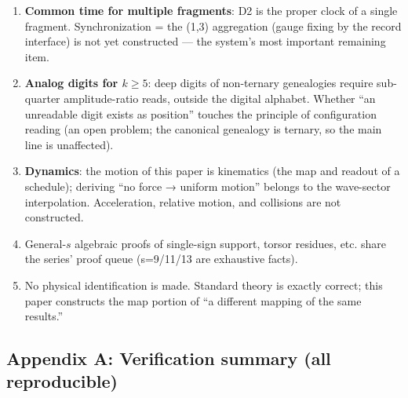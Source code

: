 \documentclass[
]{article}
\providecommand{\tightlist}{%
  \setlength{\itemsep}{0pt}\setlength{\parskip}{0pt}}
\begin{document}
\begin{enumerate}
\def\labelenumi{\arabic{enumi}.}
\tightlist
\item
  \textbf{Common time for multiple fragments}: D2 is the proper clock of
  a single fragment. Synchronization = the (1,3) aggregation (gauge
  fixing by the record interface) is not yet constructed --- the
  system's most important remaining item.
\item
  \textbf{Analog digits for \(k\ge5\)}: deep digits of non-ternary
  genealogies require sub-quarter amplitude-ratio reads, outside the
  digital alphabet. Whether ``an unreadable digit exists as position''
  touches the principle of configuration reading (an open problem; the
  canonical genealogy is ternary, so the main line is unaffected).
\item
  \textbf{Dynamics}: the motion of this paper is kinematics (the map and
  readout of a schedule); deriving ``no force → uniform motion'' belongs
  to the wave-sector interpolation. Acceleration, relative motion, and
  collisions are not constructed.
\item
  General-\(s\) algebraic proofs of single-sign support, torsor
  residues, etc. share the series' proof queue (s=9/11/13 are exhaustive
  facts).
\item
  No physical identification is made. Standard theory is exactly
  correct; this paper constructs the map portion of ``a different
  mapping of the same results.''
\end{enumerate}

\subsection{Appendix A: Verification summary (all
reproducible)}\label{appendix-a-verification-summary-all-reproducible}
\end{document}

